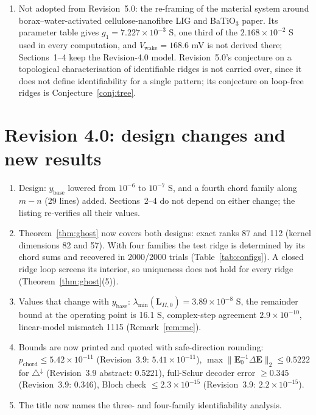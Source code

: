 \documentclass[11pt,a4paper]{article}
\theoremstyle{definition}
\theoremstyle{remark}
\begin{document}
\begin{enumerate}[noitemsep,leftmargin=*]
  the derivative $\mathbf{G}^T(\partial\mathbf{L}_{II}/\partial s_c)\mathbf{G}$ is correct only for cells not bonded to $b$; the general formula uses the harmonic extension (Lemma~\ref{lem:monotone});
  the orientation result keeps the Revision-3.9/4.0 statement (132{,}019 triangles; $0.5222$ for $\triangle^{\downarrow}$, rounded up), not the Revision-3.8 anchor count 130{,}592 and $0.5221$;
  Revision~5.0's appendix reproduced only the exact ranks, not every number of its Sections~2--3.
\item Not adopted from Revision~5.0: the re-framing of the material system around borax--water-activated cellulose-nanofibre LIG and BaTiO$_3$ paper. Its parameter table gives $g_1 = 7.227\times10^{-3}$ S, one third of the $2.168\times10^{-2}$ S used in every computation, and $V_{\text{wake}} = 168.6$ mV is not derived there; Sections~1--4 keep the Revision-4.0 model. Revision~5.0's conjecture on a topological characterisation of identifiable ridges is not carried over, since it does not define identifiability for a single pattern; its conjecture on loop-free ridges is Conjecture~\ref{conj:tree}.
\end{enumerate}

\section*{Revision 4.0: design changes and new results}
\begin{enumerate}[noitemsep,leftmargin=*]
\item Design: $y_{\text{base}}$ lowered from $10^{-6}$ to $10^{-7}$ S, and a fourth chord family along $m-n$ (29 lines) added. Sections~2--4 do not depend on either change; the listing re-verifies all their values.
\item Theorem~\ref{thm:ghost} now covers both designs: exact ranks 87 and 112 (kernel dimensions 82 and 57). With four families the test ridge is determined by its chord sums and recovered in 2000/2000 trials (Table~\ref{tab:configs}). A closed ridge loop screens its interior, so uniqueness does not hold for every ridge (Theorem~\ref{thm:ghost}(5)).
\item Values that change with $y_{\text{base}}$: $\lambda_{\min}(\mathbf{L}_{II,0}) = 3.89\times10^{-8}$ S, the remainder bound at the operating point is 16.1 S, complex-step agreement $2.9\times10^{-10}$, linear-model mismatch 1115 (Remark~\ref{rem:mc}).
\item Bounds are now printed and quoted with safe-direction rounding: $p_{\text{chord}}\le5.42\times10^{-11}$ (Revision~3.9: $5.41\times10^{-11}$), $\max\|\mathbf{E}_0^{-1}\Delta\mathbf{E}\|_2\le0.5222$ for $\triangle^{\downarrow}$ (Revision~3.9 abstract: 0.5221), full-Schur decoder error $\ge0.345$ (Revision~3.9: 0.346), Bloch check $\le 2.3\times10^{-15}$ (Revision~3.9: $2.2\times10^{-15}$).
\item The title now names the three- and four-family identifiability analysis.
\end{enumerate}
\end{document}
